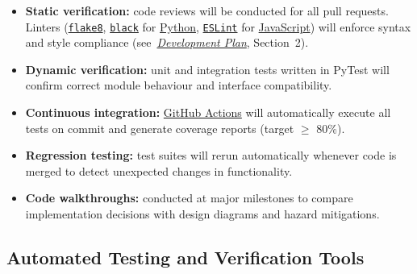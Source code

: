 \documentclass[12pt, titlepage]{article}
\begin{document}
\begin{itemize}
  \item \textbf{Static verification:} code reviews will be conducted for all pull
  requests. Linters (\texttt{\href{https://flake8.pycqa.org/en/latest/}{flake8}}, \texttt{\href{https://github.com/psf/black}{black}} for \href{https://www.python.org/}{Python}, \texttt{\href{https://eslint.org/}{ESLint}}
  for \href{https://developer.mozilla.org/en-US/docs/Web/JavaScript}{JavaScript}) will enforce syntax and style compliance
  (see~\textit{\href{https://github.com/thaafei/DomainX/blob/main/docs/DevelopmentPlan/DevelopmentPlan.pdf}{Development Plan}}, Section~2).

  \item \textbf{Dynamic verification:} unit and integration tests written in
  PyTest will confirm correct module behaviour and interface compatibility.

  \item \textbf{Continuous integration:} \href{https://github.com/thaafei/DomainX/actions}{GitHub Actions} will automatically
  execute all tests on commit and generate coverage reports (target $\geq$ 80\%).

  \item \textbf{Regression testing:} test suites will rerun automatically whenever
  code is merged to detect unexpected changes in functionality.

  \item \textbf{Code walkthroughs:} conducted at major milestones to compare
  implementation decisions with design diagrams and hazard mitigations.
\end{itemize}

\subsection{Automated Testing and Verification Tools}
\label{subsec:testing-tools}

\end{document}
